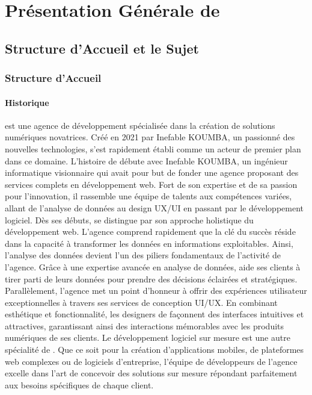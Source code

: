\part{Présentation Générale de \firm}
\label{part:presentation}
\chapter{Structure d’Accueil et le Sujet}
\section{Structure d’Accueil}
\subsection{Historique}

\mazf est une agence de développement spécialisée dans la création de solutions
numériques novatrices. Créé en 2021 par Inefable KOUMBA, un passionné des nouvelles
technologies, \mazf s'est rapidement établi comme un acteur de premier plan dans ce domaine.
L'histoire de \mazf débute avec Inefable KOUMBA, un ingénieur informatique
visionnaire qui avait pour but de fonder une agence proposant des services complets
en développement web. Fort de son expertise et de sa passion pour l’innovation,
il rassemble une équipe de talents aux compétences variées, allant de l’analyse
de données au design UX/UI en passant par le développement logiciel.
Dès ses débuts, \mazf se distingue par son approche holistique du développement
web. L’agence comprend rapidement que la clé du succès réside dans la capacité à
transformer les données en informations exploitables. Ainsi, l’analyse des données
devient l’un des piliers fondamentaux de l’activité de l’agence. Grâce à une
expertise avancée en analyse de données, \mazf aide ses clients à tirer
parti de leurs données pour prendre des décisions éclairées et stratégiques.
Parallèlement, l’agence met un point d’honneur à offrir des expériences utilisateur
exceptionnelles à travers ses services de conception UI/UX. En combinant esthétique
et fonctionnalité, les designers de \mazf façonnent des interfaces intuitives
et attractives, garantissant ainsi des interactions mémorables avec les produits
numériques de ses clients. Le développement logiciel sur mesure est une autre
spécialité de \mazf. Que ce soit pour la création d’applications mobiles,
de plateformes web complexes ou de logiciels d’entreprise, l’équipe de développeurs
de l’agence excelle dans l’art de concevoir des solutions sur mesure répondant
parfaitement aux besoins spécifiques de chaque client.

